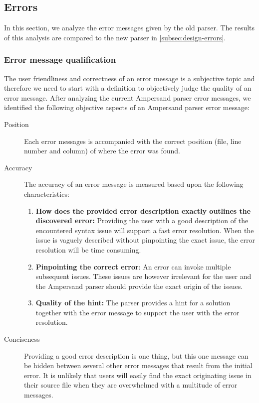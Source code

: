 \subsection{Errors}
\label{subsec:analysis-errors}
In this section, we analyze the error messages given by the old parser.
The results of this analysis are compared to the new parser in \autoref{subsec:design-errors}.

\subsubsection{Error message qualification}
The user friendliness and correctness of an error message is a subjective topic and therefore we need to start with a definition to objectively judge the quality of an error message.
After analyzing the current Ampersand parser error messages, we identified the following objective aspects of an Ampersand parser error message:
%
\begin{description}
	\item [Position]
	Each error messages is accompanied with the correct position (file, line number and column) of where the error was found.
	\item [Accuracy]
	The accuracy of an error message is measured based upon the following characteristics:
	\begin{enumerate}
		\item	\textbf{\small How does the provided error description exactly outlines the discovered error:}
				Providing the user with a good description of the encountered syntax issue will support a fast error resolution.
				When the issue is vaguely described without pinpointing the exact issue, the error resolution will be time consuming.
		\item	\textbf{\small Pinpointing the correct error}:
				An error can invoke multiple subsequent issues. 
				These issues are however irrelevant for the user and the Ampersand parser should provide the exact origin of the issues.
		\item	\textbf{\small Quality of the hint:}
			The parser provides a hint for a solution together with the error message to support the user with the error resolution.
	\end {enumerate}
    \item[Conciseness]
	Providing a good error description is one thing, but this one message can be hidden between several other error messages that result from the initial error.
	It is unlikely that users will easily find the exact originating issue in their source file when they are overwhelmed with a multitude of error messages. %
\end {description}
